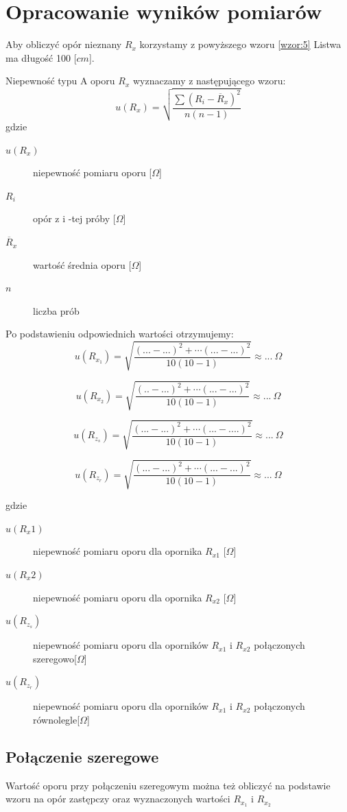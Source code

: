 \documentclass[a4paper,11pt]{article}
\begin{document}
\section{Opracowanie wyników pomiarów}
\indent Aby obliczyć opór nieznany $R_x$ korzystamy z powyższego wzoru {\ref{wzor:5}}
Listwa ma długość 100 [$cm$].

\indent Niepewność typu A oporu $R_x$ wyznaczamy z następującego wzoru:
\begin{equation}
u(R_x) = \sqrt{\frac{\sum \left( R_i - \overline{R}_x \right)^2 }{n(n-1)}}
\end{equation}
gdzie 
\begin{description}
\item [$u(R_{x})$] niepewność pomiaru oporu [$\Omega$]
\item [$R_{i}$] opór z i -tej próby [$\Omega$]
\item [$\overline{R}_x$] wartość średnia oporu [$\Omega$]
\item [$n$] liczba prób
\end{description}

Po podstawieniu odpowiednich wartości otrzymujemy:
$$
u(R_{x_{1}}) = \sqrt{\frac{(... - ...)^2 + \cdots (... - ...)^2  }{10(10-1)}}\approx ... ~\Omega
$$

$$
u(R_{x_{2}}) = \sqrt{\frac{(.. - ...)^2 + \cdots (... - ...)^2  }{10(10-1)}} \approx ... ~\Omega
$$

$$
u(R_{z_s}) = \sqrt{\frac{(... - ...)^2 + \cdots (... - ....)^2  }{10(10-1)}} \approx ... ~\Omega
$$

$$
u(R_{z_r}) = \sqrt{\frac{(... - ...)^2 + \cdots (... - ...)^2  }{10(10-1)}} \approx ... ~\Omega
$$

gdzie
\begin{description}
\item [$u(R_x1)$] niepewność pomiaru oporu dla opornika $R_{x1}$ [$\Omega$]
\item [$u(R_x2)$] niepewność pomiaru oporu dla opornika $R_{x2}$ [$\Omega$]
\item [$u(R_{z_s})$] niepewność pomiaru oporu dla oporników $R_{x1}$ i $R_{x2}$ połączonych szeregowo[$\Omega$]
\item [$u(R_{z_r})$] niepewność pomiaru oporu dla oporników $R_{x1}$ i $R_{x2}$ połączonych równolegle[$\Omega$]
\end{description}

\subsection{Połączenie szeregowe}
\indent Wartość oporu przy połączeniu szeregowym można też obliczyć na podstawie wzoru na opór zastępczy oraz wyznaczonych wartości $R_{x_1}$ i  $R_{x_2}$
\end{document}
